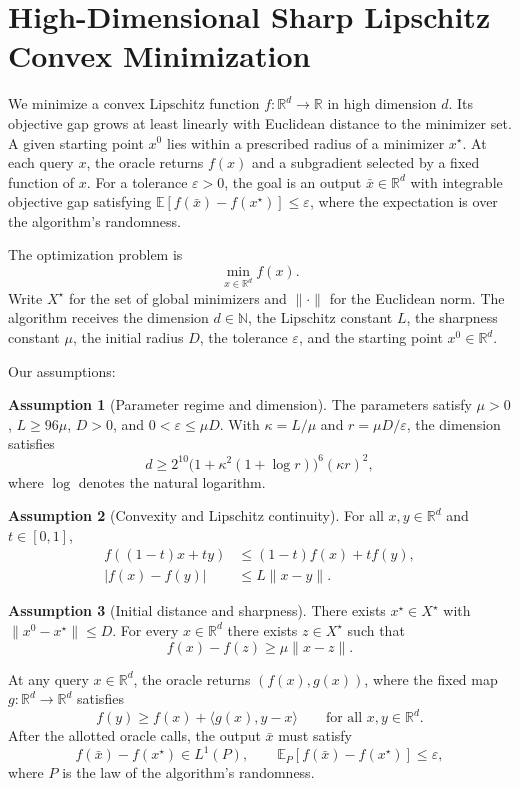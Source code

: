 \documentclass[10pt]{article}
\theoremstyle{definition}
\newtheorem{assumption}{Assumption}
\begin{document}
\section*{High-Dimensional Sharp Lipschitz Convex Minimization}
We minimize a convex Lipschitz function $f:\mathbb{R}^d\to\mathbb{R}$ in high dimension $d$. Its objective gap grows at least linearly with Euclidean distance to the minimizer set. A given starting point $x^0$ lies within a prescribed radius of a minimizer $x^\star$. At each query $x$, the oracle returns $f(x)$ and a subgradient selected by a fixed function of $x$. For a tolerance $\varepsilon>0$, the goal is an output $\bar{x}\in\mathbb{R}^d$ with integrable objective gap satisfying $\mathbb{E}[f(\bar{x})-f(x^\star)]\leq\varepsilon$, where the expectation is over the algorithm's randomness.

The optimization problem is
\[
\min_{x\in\mathbb{R}^d} f(x).
\]
Write $X^\star$ for the set of global minimizers and $\|\cdot\|$ for the Euclidean norm. The algorithm receives the dimension $d\in\mathbb{N}$, the Lipschitz constant $L$, the sharpness constant $\mu$, the initial radius $D$, the tolerance $\varepsilon$, and the starting point $x^0\in\mathbb{R}^d$.

Our assumptions:
\begin{assumption}[Parameter regime and dimension]
The parameters satisfy $\mu>0$, $L\geq96\mu$, $D>0$, and $0<\varepsilon\leq\mu D$. With $\kappa=L/\mu$ and $r=\mu D/\varepsilon$, the dimension satisfies
\[
d\geq 2^{10}\bigl(1+\kappa^2(1+\log r)\bigr)^6(\kappa r)^2,
\]
where $\log$ denotes the natural logarithm.
\end{assumption}

\begin{assumption}[Convexity and Lipschitz continuity]
For all $x,y\in\mathbb{R}^d$ and $t\in[0,1]$,
\[
\begin{aligned}
f((1-t)x+ty)&\leq (1-t)f(x)+tf(y),\\
|f(x)-f(y)|&\leq L\|x-y\|.
\end{aligned}
\]
\end{assumption}

\begin{assumption}[Initial distance and sharpness]
There exists $x^\star\in X^\star$ with $\|x^0-x^\star\|\leq D$. For every $x\in\mathbb{R}^d$ there exists $z\in X^\star$ such that
\[
f(x)-f(z)\geq\mu\|x-z\|.
\]
\end{assumption}

At any query $x\in\mathbb{R}^d$, the oracle returns $(f(x),g(x))$, where the fixed map $g:\mathbb{R}^d\to\mathbb{R}^d$ satisfies
\[
f(y)\geq f(x)+\langle g(x),y-x\rangle
\qquad\text{for all }x,y\in\mathbb{R}^d.
\]
After the allotted oracle calls, the output $\bar{x}$ must satisfy
\[
f(\bar{x})-f(x^\star)\in L^1(P),\qquad
\mathbb{E}_{P}[f(\bar{x})-f(x^\star)]\leq\varepsilon,
\]
where $P$ is the law of the algorithm's randomness.
\end{document}
